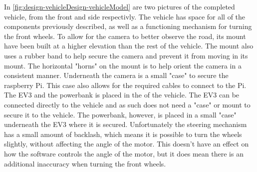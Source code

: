 In \autoref{fig:design-vehicleDesign-vehicleModel} are two pictures of the completed vehicle, from the front and side respectivly. 
The vehicle has space for all of the components previously described, as well as a functioning mechanism for turning the front wheels. 
To allow for the camera to better observe the road, its mount have been built at a higher elevation than the rest of the vehicle. 
The mount also uses a rubber band to help secure the camera and prevent it from moving in its mount. 
The horizontal "horns" on the mount is to help orient the camera in a consistent manner.
Underneath the camera is a small "case" to secure the raspberry Pi. 
This case also allows for the required cables to connect to the Pi.
The EV3 and the powerbank is placed in the of the vehicle. 
The EV3 can be connected directly to the vehicle and as such does not need a "case" or mount to secure it to the vehicle. 
The powerbank, however, is placed in a small "case" underneath the EV3 where it is secured. 
Unfortunately the steering mechanism has a small amount of backlash, which means it is possible to turn the wheels slightly, without affecting the angle of the motor.
This doesn't have an effect on how the software controls the angle of the motor, but it does mean there is an additional inaccuracy when turning the front wheels. 